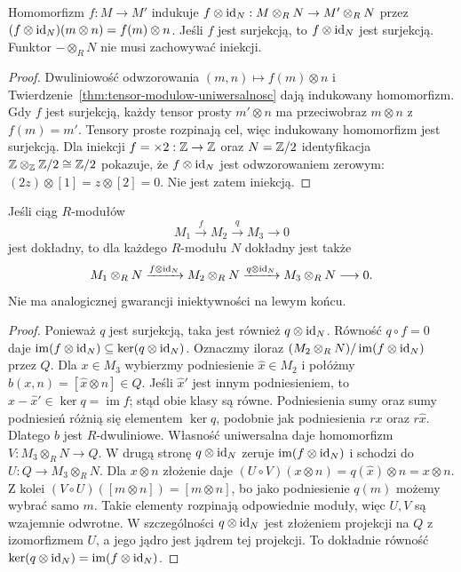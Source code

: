 \begin{stwierdzenie}
\label{prop:tensor-maps-algebra}
Homomorfizm $f:M\to M'$ indukuje
$f\otimes\mathrm{id}_N:M\otimes_R N\to M'\otimes_R N$
przez $(f\otimes\mathrm{id}_N)(m\otimes n)=f(m)\otimes n$.
Jeśli $f$ jest surjekcją, to $f\otimes\mathrm{id}_N$
jest surjekcją. Funktor $-\otimes_R N$ nie musi
zachowywać iniekcji.
\end{stwierdzenie}
\begin{proof}
Dwuliniowość odwzorowania $(m,n)\mapsto f(m)\otimes n$
i Twierdzenie~\ref{thm:tensor-modulow-uniwersalnosc}
dają indukowany homomorfizm.
Gdy $f$ jest surjekcją, każdy tensor prosty
$m'\otimes n$ ma przeciwobraz $m\otimes n$
z $f(m)=m'$. Tensory proste rozpinają cel,
więc indukowany homomorfizm jest surjekcją.
Dla iniekcji $f=\times2:\mathbb{Z}\to\mathbb{Z}$ oraz
$N=\mathbb{Z}/2$ identyfikacja
$\mathbb{Z}\otimes_{\mathbb{Z}}\mathbb{Z}/2\cong\mathbb{Z}/2$ pokazuje,
że $f\otimes\mathrm{id}_N$ jest odwzorowaniem zerowym:
$(2z)\otimes[1]=z\otimes[2]=0$.
Nie jest zatem iniekcją.
\end{proof}

\begin{stwierdzenie}
\label{prop:tensor-prawostronnie-dokladny}
Jeśli ciąg $R$-modułów
\[
 M_1\xrightarrow{f}M_2\xrightarrow{q}M_3\longrightarrow0
\]
jest dokładny, to dla każdego $R$-modułu $N$ dokładny jest także
\[
 M_1\otimes_R N\xrightarrow{f\otimes\mathrm{id}_N}
 M_2\otimes_R N\xrightarrow{q\otimes\mathrm{id}_N}
 M_3\otimes_R N\longrightarrow0.
\]
Nie ma analogicznej gwarancji iniektywności na lewym końcu.
\end{stwierdzenie}
\begin{proof}
Ponieważ $q$ jest surjekcją, taka jest również $q\otimes\mathrm{id}_N$.
Równość $q\circ f=0$ daje
$\operatorname{im}(f\otimes\mathrm{id}_N)\subseteq\ker(q\otimes\mathrm{id}_N)$.
Oznaczmy iloraz $(M_2\otimes_R N)/\operatorname{im}(f\otimes\mathrm{id}_N)$
przez $Q$. Dla $x\in M_3$ wybierzmy podniesienie
$\widehat x\in M_2$ i połóżmy
$b(x,n)=[\widehat x\otimes n]\in Q$.
Jeśli $\widehat x'$ jest innym podniesieniem, to
$\widehat x-\widehat x'\in\ker q=\operatorname{im}f$;
stąd obie klasy są równe. Podniesienia sumy oraz
sumy podniesień różnią się elementem $\ker q$,
podobnie jak podniesienia $rx$ oraz $r\widehat x$.
Dlatego $b$ jest $R$-dwuliniowe. Własność uniwersalna
daje homomorfizm $V:M_3\otimes_R N\to Q$.
W drugą stronę $q\otimes\mathrm{id}_N$ zeruje
$\operatorname{im}(f\otimes\mathrm{id}_N)$ i schodzi do
$U:Q\to M_3\otimes_R N$.
Dla $x\otimes n$ złożenie daje
$(U\circ V)(x\otimes n)=q(\widehat x)\otimes n=x\otimes n$.
Z kolei $(V\circ U)([m\otimes n])=[m\otimes n]$,
bo jako podniesienie $q(m)$ możemy wybrać samo $m$.
Takie elementy rozpinają odpowiednie moduły,
więc $U,V$ są wzajemnie odwrotne.
W szczególności $q\otimes\mathrm{id}_N$ jest złożeniem projekcji
na $Q$ z izomorfizmem $U$, a jego jądro jest jądrem tej projekcji.
To dokładnie równość
$\ker(q\otimes\mathrm{id}_N)=\operatorname{im}(f\otimes\mathrm{id}_N)$.
\end{proof}

